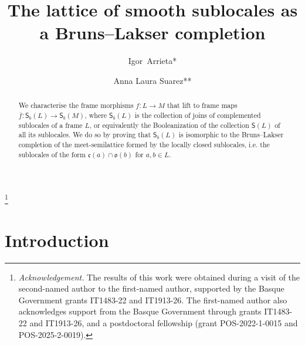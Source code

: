 \documentclass[11pt,a4paper,reqno]{amsart}
\def\cl{\mathfrak{c}}
\def\op{\mathfrak{o}}
\theoremstyle{definition}
\theoremstyle{remark}
\newcommand{\mf}{\mathsf}
\newcommand{\sll}{\mf{S}(L)}
\newcommand{\Sb}{\mf{S}_b}
\begin{document}
\title[The lattice of smooth sublocales as a Bruns--Lakser completion]{The lattice of smooth sublocales as a Bruns--Lakser completion}
 \author[I.~Arrieta \and A.~L.~Suarez]
{Igor~Arrieta* \and Anna Laura Suarez**}

\newcommand{\acr}{\newline\indent}

\address{\llap{*\,}Departamento de Matem\'aticas\acr
Universidad del Pa\'{\i}s Vasco UPV/EHU\acr
48080 Bilbao\acr
SPAIN}


\address{\llap{**\,}Department of Mathematics and Applied Mathematics\acr
University of the Western Cape\acr
Private Bag X17 Bellville 7535, Cape Town\acr
SOUTH AFRICA}

\thanks{\emph{Acknowledgement.} The results of this work were obtained during a visit of the second-named author to the first-named author, supported by the Basque Government grants IT1483-22 and IT1913-26. The first-named author also acknowledges support from the Basque Government through grants IT1483-22 and IT1913-26, and a postdoctoral fellowship (grant POS-2022-1-0015 and POS-2025-2-0019).}

\begin{abstract}
    We characterise the frame morphisms $f:L\to M$ that lift to frame maps $\overline{f}:\Sb(L)\to \Sb(M)$, where $\Sb(L)$ is the collection of joins of complemented sublocales of a frame $L$, or equivalently the Booleanization of the collection $\sll$ of all its sublocales. We do so by proving that $\Sb(L)$ is isomorphic to the Bruns--Lakser completion of the meet-semilattice formed by the locally closed sublocales, i.e. the sublocales of the form $\cl(a)\cap \op(b)$ for $a,b\in L$.
\end{abstract}

\maketitle

\tableofcontents

\section{Introduction}
\end{document}

